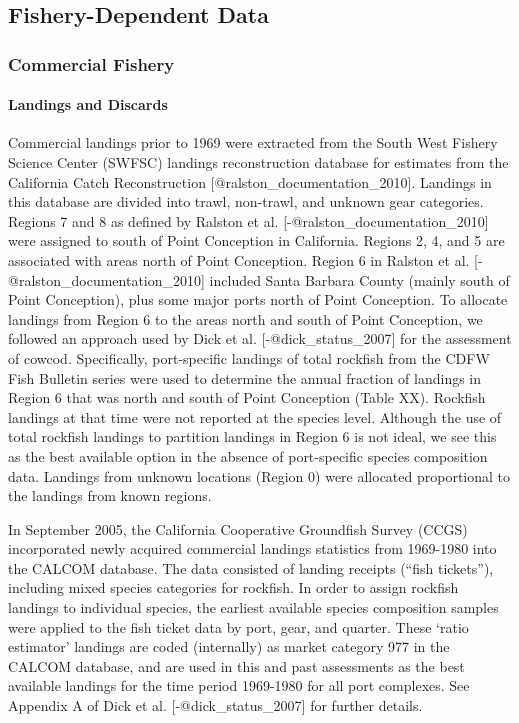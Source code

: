 \documentclass[
]{article}
\author{}
\date{\vspace{-2.5em}}
\begin{document}
\hypertarget{fishery-dependent-data}{%
\subsection{Fishery-Dependent Data}\label{fishery-dependent-data}}

\hypertarget{commercial-fishery}{%
\subsubsection{Commercial Fishery}\label{commercial-fishery}}

\hypertarget{landings-and-discards}{%
\paragraph{Landings and Discards}\label{landings-and-discards}}

\hfill\break

Commercial landings prior to 1969 were extracted from the South West
Fishery Science Center (SWFSC) landings reconstruction database for
estimates from the California Catch Reconstruction
{[}@ralston\_documentation\_2010{]}. Landings in this database are
divided into trawl, non-trawl, and unknown gear categories. Regions 7
and 8 as defined by Ralston et al. {[}-@ralston\_documentation\_2010{]}
were assigned to south of Point Conception in California. Regions 2, 4,
and 5 are associated with areas north of Point Conception. Region 6 in
Ralston et al. {[}-@ralston\_documentation\_2010{]} included Santa
Barbara County (mainly south of Point Conception), plus some major ports
north of Point Conception. To allocate landings from Region 6 to the
areas north and south of Point Conception, we followed an approach used
by Dick et al. {[}-@dick\_status\_2007{]} for the assessment of cowcod.
Specifically, port-specific landings of total rockfish from the CDFW
Fish Bulletin series were used to determine the annual fraction of
landings in Region 6 that was north and south of Point Conception (Table
XX). Rockfish landings at that time were not reported at the species
level. Although the use of total rockfish landings to partition landings
in Region 6 is not ideal, we see this as the best available option in
the absence of port-specific species composition data. Landings from
unknown locations (Region 0) were allocated proportional to the landings
from known regions.

In September 2005, the California Cooperative Groundfish Survey (CCGS)
incorporated newly acquired commercial landings statistics from
1969-1980 into the CALCOM database. The data consisted of landing
receipts (``fish tickets''), including mixed species categories for
rockfish. In order to assign rockfish landings to individual species,
the earliest available species composition samples were applied to the
fish ticket data by port, gear, and quarter. These `ratio estimator'
landings are coded (internally) as market category 977 in the CALCOM
database, and are used in this and past assessments as the best
available landings for the time period 1969-1980 for all port complexes.
See Appendix A of Dick et al. {[}-@dick\_status\_2007{]} for further
details.
\end{document}
